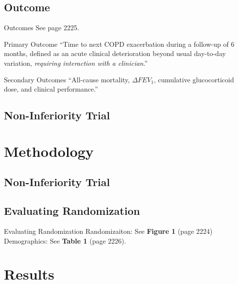 \documentclass{beamer}
\begin{document}
	\subsection{Outcome}
		\begin{frame}{Outcomes}
			See page 2225.
			\pause
			\begin{block}{Primary Outcome}
				``Time to next COPD exacerbation during a follow-up of 6 months, defined as an acute clinical deterioration beyond usual day-to-day variation, \textit{requiring interaction with a clinician}.''
			\end{block}
			\begin{alertblock}{Secondary Outcomes}
				``All-cause mortality, $\Delta FEV_1$, cumulative glucocorticoid dose, and clinical performance.''
			\end{alertblock}
		\end{frame}
		\subsection{Non-Inferiority Trial}
\section{Methodology}
	\subsection{Non-Inferiority Trial}
	\subsection{Evaluating Randomization}
		\begin{frame}{Evaluating Randomization}
			Randomizaiton: See \textbf{Figure 1} (page 2224)
			\\
			Demographics: See \textbf{Table 1} (page 2226).
		\end{frame}
\section{Results}
\end{document}
